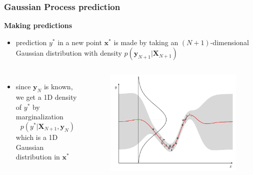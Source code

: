\documentclass[sans,mathserif]{beamer}
\newcommand{\xx}{\mathrm{\mathbf{x}}}
\newcommand{\XX}{\mathrm{\mathbf{X}}}
\newcommand{\yy}{\mathrm{\mathbf{y}}}
\begin{document}
\begin{frame}
  \frametitle{Gaussian Process prediction}
  \textbf{Making predictions}
  \begin{itemize}
    \item prediction $y^*$ in a new point $\xx^*$ is made by taking an $(N+1)$-dimensional
        Gaussian distribution with density \newline
        $p(\yy_{N+1} | \XX_{N+1})$
  \end{itemize}

  \begin{columns}[T]
  \column{5.5cm}
    \begin{itemize}
    \item since $\yy_N$ is known, we get a \alert{1D density} of $y^*$ by marginalization
        $$p(y^* | \XX_{N+1}, \yy_N)$$
        which is a 1D Gaussian distribution in $\xx^*$
    \end{itemize}
  \column{4.5cm}
    \begin{figure}
    \includegraphics[width=\linewidth]{img/gp3-gauss}
    \end{figure}
  \end{columns}
\end{frame}
\end{document}
